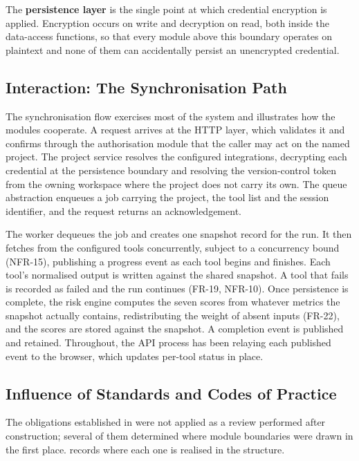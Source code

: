 The \textbf{persistence layer} is the single point at which credential encryption
is applied. Encryption occurs on write and decryption on read, both inside the
data-access functions, so that every module above this boundary operates on
plaintext and none of them can accidentally persist an unencrypted credential.

\subsection{Interaction: The Synchronisation Path}
\label{subsec:interaction-sync}

The synchronisation flow exercises most of the system and illustrates how the
modules cooperate. A request arrives at the HTTP layer, which validates it and
confirms through the authorisation module that the caller may act on the named
project. The project service resolves the configured integrations, decrypting
each credential at the persistence boundary and resolving the version-control
token from the owning workspace where the project does not carry its own. The
queue abstraction enqueues a job carrying the project, the tool list and the
session identifier, and the request returns an acknowledgement.

The worker dequeues the job and creates one snapshot record for the run. It then
fetches from the configured tools concurrently, subject to a concurrency bound
(NFR-15), publishing a progress event as each tool begins and finishes. Each
tool's normalised output is written against the shared snapshot. A tool that
fails is recorded as failed and the run continues (FR-19, NFR-10). Once
persistence is complete, the risk engine computes the seven scores from whatever
metrics the snapshot actually contains, redistributing the weight of absent
inputs (FR-22), and the scores are stored against the snapshot. A completion
event is published and retained. Throughout, the API process has been relaying
each published event to the browser, which updates per-tool status in place.

\subsection{Influence of Standards and Codes of Practice}
\label{subsec:standards-in-design}

The obligations established in  were not applied as a review
performed after construction; several of them determined where module boundaries
were drawn in the first place.  records where each
one is realised in the structure.

